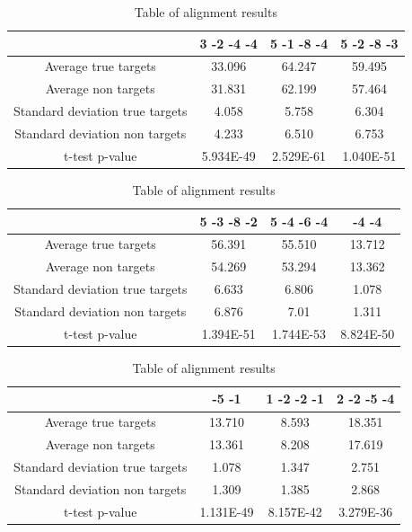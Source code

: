 \documentclass[12pt]{article}
\begin{document}
\begin{table} [h]
\centering
\footnotesize
\caption{Table of alignment results}
\vspace{0.3cm}
\begin{tabular}{c|c|c|c}
& 3 -2 -4 -4 & 5 -1 -8 -4 & 5 -2 -8 -3 \\
\hline\hline
Average true targets & 33.096 & 64.247 & 59.495	\\
Average	non targets & 31.831 & 62.199 & 57.464 \\
\hline
Standard deviation true targets & 4.058	& 5.758 & 6.304\\
Standard deviation non targets & 4.233 & 6.510 & 6.753 \\
\hline
t-test p-value & 5.934E-49 & 2.529E-61 & 1.040E-51 \\\hline
\end{tabular}\vspace{0.5cm}

\begin{tabular}{c|c|c|c}
& 5 -3 -8 -2 & 5 -4 -6 -4 & -4 -4 \\
\hline\hline
Average true targets & 56.391 & 55.510 & 13.712 \\
Average	non targets & 54.269 & 53.294 & 13.362\\
\hline
Standard deviation true targets & 6.633 & 6.806 & 1.078\\
Standard deviation non targets & 6.876 & 7.01 & 1.311\\
\hline
t-test p-value & 1.394E-51 & 1.744E-53 & 8.824E-50 \\\hline
\end{tabular}\vspace{0.5cm}


\begin{tabular}{c|c|c|c}
 & -5 -1 & 1 -2 -2 -1 & 2 -2 -5 -4  \\
\hline\hline
Average true targets & 13.710 & 8.593 & 18.351\\
Average	non targets  & 13.361 &	8.208 &	17.619 \\
\hline
Standard deviation true targets & 1.078	& 1.347	& 2.751\\
Standard deviation non targets & 1.309 & 1.385 & 2.868\\
\hline
t-test p-value & 1.131E-49 & 8.157E-42 & 3.279E-36 \\
\hline
\end{tabular}
\label{table:results}
\end{table}
\end{document}
